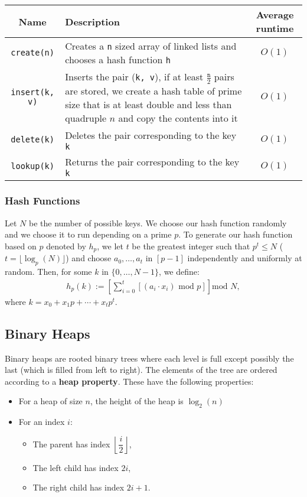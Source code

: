 \begin{center}
  \begin{tabular}{ || c | p{7.5cm} | c || }
    \hline
    Name & Description & Average runtime \\
    \hline
    \texttt{create(n)} & Creates a \texttt{n} sized array
    of linked lists and chooses a hash function \texttt{h} & $O(1)$ \\
    \hline
    \texttt{insert(k, v)} & Inserts the pair (\texttt{k, v}),
    if at least $\frac{\texttt{n}}{2}$ pairs are stored, we create a hash
    table of prime size that is at least double and less than quadruple 
    $n$ and copy the contents into it & $O(1)$ \\
    \hline
    \texttt{delete(k)} & Deletes the pair corresponding to the key \texttt{k} & $O(1)$ \\
    \hline
    \texttt{lookup(k)} & Returns the pair corresponding to the key \texttt{k} & $O(1)$ \\
    \hline
  \end{tabular}
\end{center}

\subsubsection{Hash Functions}

Let $N$ be the number of possible keys.
We choose our hash function randomly and we choose it to run
depending on a prime $p$. To generate our hash function based
on $p$ denoted by $h_p$, we let $t$ be the greatest integer such
that $p^t \leq N$ ($t = \lfloor \log_p(N) \rfloor$) and choose
$a_0, \ldots, a_t$ in $[p - 1]$ independently and uniformly at random.
Then, for some $k$ in $\{0, \ldots, N - 1\}$, we define: \begin{gather*}
  h_p(k) := \left[ 
    \sum_{i = 0}^t \left[ (a_i \cdot x_i) \text{ mod } p \right] 
  \right] \text{mod } N,
\end{gather*} where $k = x_0 + x_1p + \cdots + x_tp^t$.

\newpage

\subsection{Binary Heaps}

Binary heaps are rooted binary trees where each level is full except
possibly the last (which is filled from left to right). The
elements of the tree are ordered according to a 
\textbf{heap property}. These have the following properties: \begin{itemize}
  \item For a heap of size $n$, the height of the heap is $\log_2(n)$
  \item For an index $i$: \begin{itemize}
    \item The parent has index $\left\lfloor \dfrac{i}{2} \right\rfloor$,
    \item The left child has index $2i$,
    \item The right child has index $2i + 1$.
  \end{itemize}
\end{itemize}

